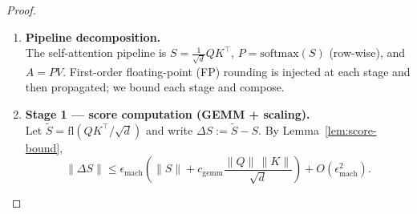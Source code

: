 \documentclass[twoside]{article}
\theoremstyle{definition}
\theoremstyle{remark}
\begin{document}
\begin{proof}
\phantom{.}
\begin{enumerate}
  \item \textbf{Pipeline decomposition.}\\
  The self-attention pipeline is $S=\tfrac{1}{\sqrt d}QK^\top$, $P=\mathrm{softmax}(S)$ (row-wise), and $A=PV$.
  First-order floating-point (FP) rounding is injected at each stage and then propagated; we bound each stage and compose.

  \item \textbf{Stage 1 — score computation (GEMM + scaling).}\\
  Let $\widetilde{S}=\mathrm{fl}(QK^\top/\sqrt d)$ and write
  $\Delta S:=\widetilde{S}-S$. By Lemma~\ref{lem:score-bound},
  \[
  \|\Delta S\|
  \le
  \epsilon_{\mathrm{mach}}
  \left(
  \|S\|
  +
  c_{\mathrm{gemm}}\frac{\|Q\|\,\|K\|}{\sqrt d}
  \right)
  +O(\epsilon_{\mathrm{mach}}^2).
  \]


\end{enumerate}
\end{proof}
\end{document}
